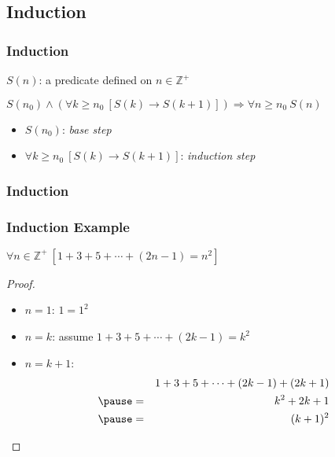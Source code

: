 \documentclass[dvipsnames]{beamer}
\begin{document}
\subsection{Induction}

\begin{frame}
  \frametitle{Induction}

  \begin{definition}
    $S(n)$: a predicate defined on $n \in \mathbb{Z}^+$

    \pause
    \medskip
    $S(n_0) \wedge (\forall k \geq n_0~[S(k) \rightarrow S(k+1)])
      \Rightarrow \forall n \geq n_0~S(n)$
  \end{definition}

  \pause
  \medskip
  \begin{itemize}
    \item $S(n_0)$: \emph{base step}
    \item $\forall k \geq n_0~[S(k) \rightarrow S(k+1)]$: \emph{induction step}
  \end{itemize}
\end{frame}

\begin{frame}
  \frametitle{Induction}

  \begin{center}
  \end{center}
\end{frame}

\begin{frame}
  \frametitle{Induction Example}

  \begin{theorem}
    $\forall n \in \mathbb{Z}^+~[1+3+5+\cdots+(2n-1)=n^2]$
  \end{theorem}

  \pause
  \begin{proof}
    \begin{itemize}
      \item $n=1$: $1=1^2$

      \pause
      \item $n=k$: assume $1+3+5+\cdots+(2k-1)=k^2$

      \pause
      \item $n=k+1$:
      \begin{eqnarray*}
        &   & 1+3+5+\cdots+(2k-1)+(2k+1)\\\pause
        & = & k^2+2k+1\\\pause
        & = & (k+1)^2
      \end{eqnarray*}
    \end{itemize}
  \end{proof}
\end{frame}
\end{document}
